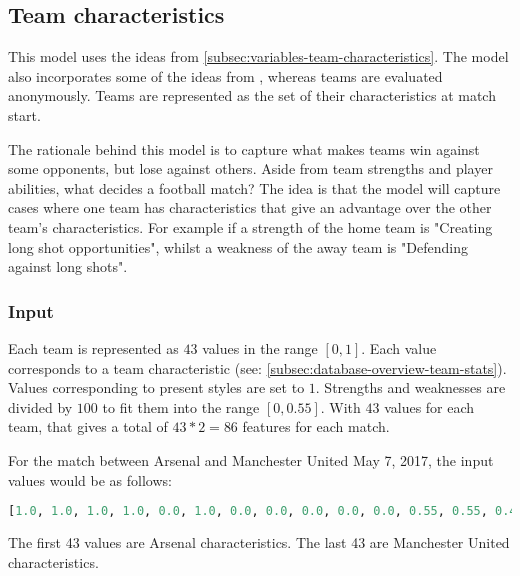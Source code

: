 \subsection{Team characteristics}

This model uses the ideas from \cref{subsec:variables-team-characteristics}. The model also incorporates some of the ideas from \citet{bib:constantinou-fenton-neil-2012}, whereas teams are evaluated anonymously. Teams are represented as the set of their characteristics at match start.

The rationale behind this model is to capture what makes teams win against some opponents, but lose against others. Aside from team strengths and player abilities, what decides a football match? The idea is that the model will capture cases where one team has characteristics that give an advantage over the other team's characteristics. For example if a strength of the home team is "Creating long shot opportunities", whilst a weakness of the away team is "Defending against long shots".

\subsubsection{Input}

Each team is represented as $43$ values in the range $[0, 1]$. Each value corresponds to a team characteristic (see: \cref{subsec:database-overview-team-stats}). Values corresponding to present styles are set to $1$. Strengths and weaknesses are divided by $100$ to fit them into the range $[0, 0.55]$. With $43$ values for each team, that gives a total of $43 * 2 = 86$ features for each match.

For the match between Arsenal and Manchester United May 7, 2017, the input values would be as follows:
\begin{lstlisting}[language=Python]
    [1.0, 1.0, 1.0, 1.0, 0.0, 1.0, 0.0, 0.0, 0.0, 0.0, 0.0, 0.55, 0.55, 0.45, 0.45, 0.0, 0.0, 0.0, 0.25, 0.0, 0.0, 0.0, 0.0, 0.0, 0.0, 0.0, 0.0, 0.0, 0.0, 0.0, 0.15, 0.0, 0.0, 0.0, 0.0, 0.45, 0.0, 0.0, 0.0, 0.45, 1.0, 0.0, 1.0, 1.0, 1.0, 1.0, 0.0, 0.0, 0.0, 1.0, 0.0, 0.0, 1.0, 0.0, 0.25, 0.0, 0.45, 0.0, 0.45, 0.55, 0.45, 0.15, 0.0, 0.0, 0.45, 0.0, 0.0, 0.0, 0.0, 0.0, 0.0, 0.0, 0.0, 0.0, 0.0, 0.0, 0.0, 0.0, 0.55, 0.0, 0.0, 1.0, 0.55, 0.0, 1.0, 1.0]
\end{lstlisting}
The first 43 values are Arsenal characteristics. The last 43 are Manchester United characteristics.